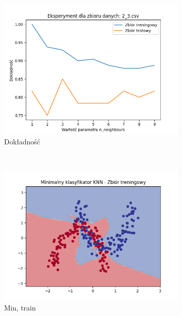\documentclass[12pt]{article}
\newcommand*{\subfigwidth}{0.15\textwidth}
\begin{document}
\begin{figure}[H]\centering
    \begin{subfigure}[t]{\subfigwidth}
        \includegraphics[width=\linewidth]{img/exp_2/knn/2_3/accuracy.png}
        \caption{Dokładność}
    \end{subfigure}
    \\
    \begin{subfigure}[t]{\subfigwidth}
        \includegraphics[width=\linewidth]{img/exp_2/knn/2_3/min/train_boundary.png}
        \caption{Min, train}
    \end{subfigure}
    \hfill
    \begin{subfigure}[t]{\subfigwidth}

\end{subfigure}
\end{figure}
\end{document}
